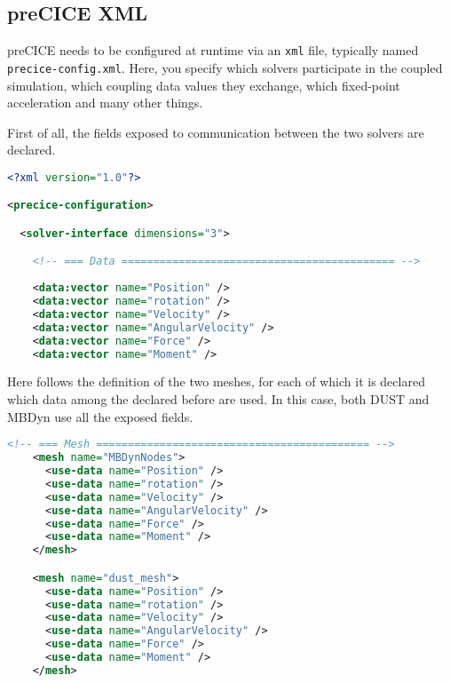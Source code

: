 \subsection{preCICE XML}
preCICE needs to be configured at runtime via an \texttt{xml} file, 
typically named \texttt{precice-config.xml}. Here, you specify which 
solvers participate in the coupled simulation, which coupling data 
values they exchange, which fixed-point acceleration and many other things.

First of all, the fields exposed to communication between the two solvers are declared.
\begin{lstlisting}[language=XML]
<?xml version="1.0"?>

<precice-configuration>

  <solver-interface dimensions="3">

    <!-- === Data =========================================== -->
    
    <data:vector name="Position" />
    <data:vector name="rotation" />
    <data:vector name="Velocity" />
    <data:vector name="AngularVelocity" />
    <data:vector name="Force" />
    <data:vector name="Moment" />
\end{lstlisting}  

Here follows the definition of the two meshes, for each of which it is 
declared which data among the declared before are used.
In this case, both DUST and MBDyn use all the exposed fields.
\begin{lstlisting}[language=XML]
    <!-- === Mesh =========================================== -->
    <mesh name="MBDynNodes">
      <use-data name="Position" />
      <use-data name="rotation" />
      <use-data name="Velocity" />
      <use-data name="AngularVelocity" />
      <use-data name="Force" />
      <use-data name="Moment" />
    </mesh>

    <mesh name="dust_mesh">
      <use-data name="Position" />
      <use-data name="rotation" />
      <use-data name="Velocity" />
      <use-data name="AngularVelocity" />
      <use-data name="Force" />
      <use-data name="Moment" />
    </mesh>
\end{lstlisting} 

